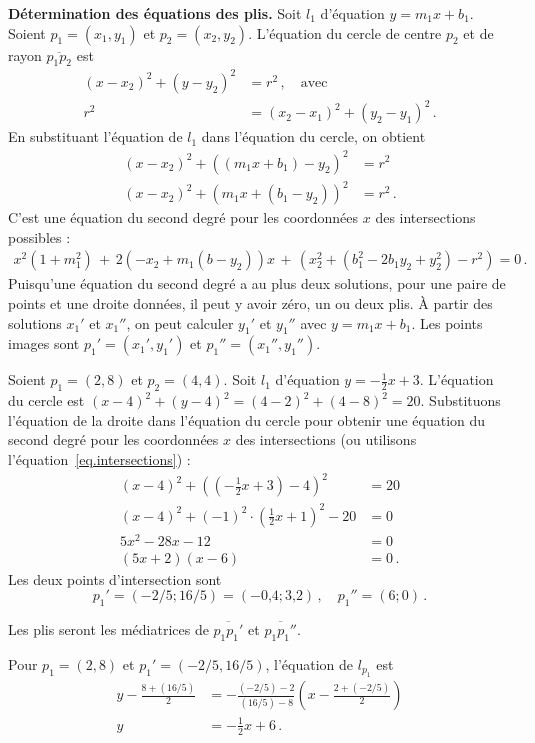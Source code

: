 \noindent\textbf{Détermination des équations des plis.}
Soit $l_1$ d'équation $y=m_1x + b_1$. Soient $p_1=(x_1,y_1)$ et  $p_2=(x_2,y_2)$. L'équation du cercle de centre $p_2$ et de rayon $\overline{p_1p_2}$ est 
\begin{align*}
(x-x_2)^2 + (y-y_2)^2 &= r^2\,,\quad \textrm{avec}\\
r^2&= (x_2-x_1)^2 + (y_2-y_1)^2\,.
\end{align*}
En substituant l'équation de $l_1$ dans l'équation du cercle, on obtient 
\begin{align*}
(x-x_2)^2+((m_1x+b_1)-y_2)^2&=r^2\\
(x-x_2)^2+(m_1x+(b_1-y_2))^2&=r^2\,.
\end{align*}
C'est une équation du second degré  pour les coordonnées $x$ des intersections possibles :
\begin{align}
x^2(1+m_1^2) \,+\, 2(-x_2+m_1(b-y_2))x \,+\,(x_2^2 + (b_1^2 - 2b_1y_2+y_2^2)-r^2)=0\,.\label{eq.intersections}
\end{align}
Puisqu'une équation du second degré a au plus deux solutions, pour une paire de points et une droite données, il peut y avoir zéro, un ou deux plis. À partir des solutions $x_1'$ et $x_1''$, on peut calculer $y_1'$ et $y_1''$ avec  $y=m_1x+b_1$. Les points images sont $p_1'=(x_1',y_1')$ et $p_1''=(x_1'',y_1'')$.
\begin{example}
Soient $p_1=(2,8)$ et $p_2=(4,4)$. Soit $l_1$ d'équation  $y=-\frac{1}{2}x +3$. L'équation du cercle est $(x-4)^2 + (y-4)^2 = (4-2)^2+(4-8)^2=20$. Substituons  l'équation de la droite dans l'équation du cercle pour obtenir une équation du second degré pour les coordonnées $x$ des intersections (ou utilisons  l'équation~\ref{eq.intersections}) :
\begin{align*}
(x-4)^2 + \left(\left(-\frac{1}{2}x+3\right)-4\right)^2&=20\\
(x-4)^2 + (-1)^2\cdot\left(\frac{1}{2}x+1\right)^2-20&=0\\
5x^2 -28x -12&=0\\
(5x+2)(x-6)&=0\,.
\end{align*}
Les deux points d'intersection sont 
\[
p_1'=(-2/5; 16/5) = (-\mbox{0,4}; \mbox{3,2})\,,\quad p_1''=(6; 0)\,.
\]
\end{example}
Les plis seront les médiatrices de $\overline{p_1p_1'}$ et $\overline{p_1p_1''}$.
\begin{example}
Pour $p_1=(2,8)$ et $p_1'=(-2/5,16/5)$, l'équation de  $l_{p_1}$  est 
\begin{align*}
y-\frac{8+(16/5)}{2}&=-\frac{(-2/5)-2}{(16/5)-8}\left(x-\frac{2+\left(-2/5\right)}{2}\right)\\
y&=-\frac{1}{2}x+6\,.
\end{align*}
\end{example}

